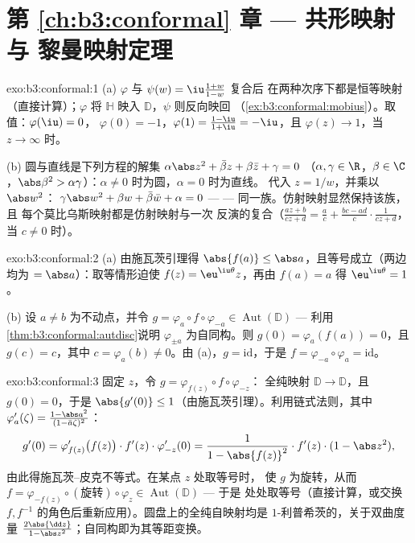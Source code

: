 \section*{第 \ref{ch:b3:conformal} 章 --- 共形映射与
黎曼映射定理}

\begin{solution}{exo:b3:conformal:1}
(a) $\varphi$ 与 $\psi(w) = \iu\frac{1+w}{1-w}$ 复合后
在两种次序下都是恒等映射（直接计算）；$\varphi$
将 $\mathbb H$ 映入 $\mathbb D$，$\psi$ 则反向映回
（\cref{ex:b3:conformal:mobius}）。取值：$\varphi(\iu) = 0$，
$\varphi(0) = -1$，$\varphi(1) = \frac{1 - \iu}{1 + \iu} =
-\iu$，且 $\varphi(z) \to 1$，当 $z \to \infty$ 时。

(b) 圆与直线是下列方程的解集
$\alpha\abs z^2 + \bar\beta z + \beta\bar z + \gamma = 0$
（$\alpha, \gamma \in \R$，$\beta \in \C$，$\abs\beta^2 >
\alpha\gamma$）：$\alpha \neq 0$ 时为圆，$\alpha = 0$ 时为直线。
代入 $z = 1/w$，并乘以 $\abs w^2$：
$\gamma\abs w^2 + \beta w + \bar\beta\bar w + \alpha = 0$ ---
--- 同一族。仿射映射显然保持该族，且
每个莫比乌斯映射都是仿射映射与一次
反演的复合（$\frac{az+b}{cz+d} = \frac ac + \frac{bc -
ad}{c}\cdot\frac1{cz + d}$，当 $c \neq 0$ 时）。
\end{solution}

\begin{solution}{exo:b3:conformal:2}
(a) 由施瓦茨引理得 $\abs{f(a)} \leq \abs a$，且等号成立（两边
均为 $= \abs a$）：取等情形迫使 $f(z) =
\eu^{\iu\theta}z$，再由 $f(a) = a$ 得 $\eu^{\iu\theta} = 1$。

(b) 设 $a \neq b$ 为不动点，并令 $g =
\varphi_a\circ f\circ\varphi_{-a} \in
\operatorname{Aut}(\mathbb D)$ --- 利用
\cref{thm:b3:conformal:autdisc}说明 $\varphi_{\pm a}$ 为自同构。则
$g(0) = \varphi_a(f(a)) = 0$，且 $g(c) = c$，其中 $c =
\varphi_a(b) \neq 0$。由 (a)，$g = \mathrm{id}$，于是 $f =
\varphi_{-a}\circ\varphi_a = \mathrm{id}$。
\end{solution}

\begin{solution}{exo:b3:conformal:3}
固定 $z$，令 $g = \varphi_{f(z)}\circ f\circ\varphi_{-z}$：
全纯映射 $\mathbb D \to \mathbb D$，且 $g(0) = 0$，于是
$\abs{g'(0)} \leq 1$（由施瓦茨引理）。利用链式法则，其中
$\varphi_a'(\zeta) = \frac{1 - \abs a^2}{(1 - \bar
a\zeta)^2}$：
\[
g'(0) = \varphi_{f(z)}'\bigl(f(z)\bigr)\cdot f'(z)\cdot
\varphi_{-z}'(0)
= \frac{1}{1 - \abs{f(z)}^2}\cdot f'(z)\cdot(1 - \abs z^2),
\]
由此得施瓦茨--皮克不等式。在某点 $z$ 处取等号时，
使 $g$ 为旋转，从而 $f =
\varphi_{-f(z)}\circ(\text{旋转})\circ\varphi_z \in
\operatorname{Aut}(\mathbb D)$ --- 于是
处处取等号（直接计算，或交换 $f, f^{-1}$
的角色后重新应用）。圆盘上的全纯自映射均是
$1$-利普希茨的，关于双曲度量 $\frac{2\abs{\dd
z}}{1 - \abs z^2}$；自同构即为其等距变换。
\end{solution}

